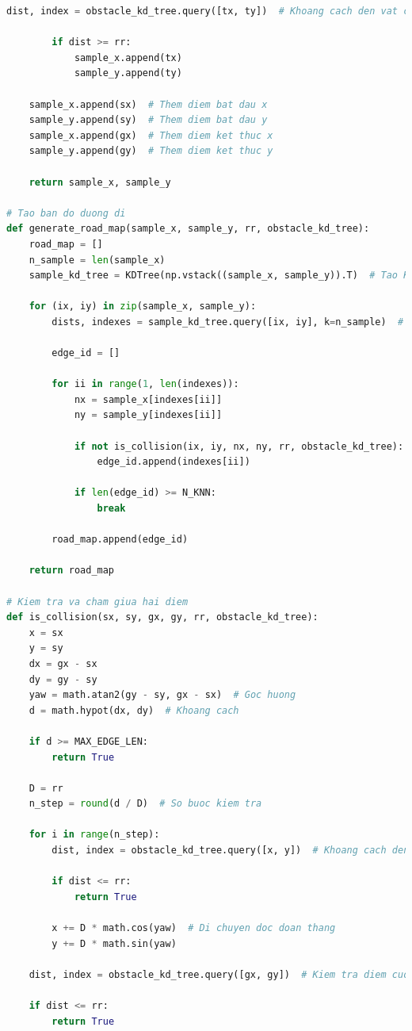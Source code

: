 \documentclass[12pt,a4paper,openany,oneside]{report}
\begin{document}
\begin{lstlisting}[language=Python, caption=Cài đặt thuật toán PRM bằng Python]
        dist, index = obstacle_kd_tree.query([tx, ty])  # Khoang cach den vat can

        if dist >= rr:
            sample_x.append(tx)
            sample_y.append(ty)

    sample_x.append(sx)  # Them diem bat dau x
    sample_y.append(sy)  # Them diem bat dau y
    sample_x.append(gx)  # Them diem ket thuc x
    sample_y.append(gy)  # Them diem ket thuc y

    return sample_x, sample_y

# Tao ban do duong di
def generate_road_map(sample_x, sample_y, rr, obstacle_kd_tree):
    road_map = []
    n_sample = len(sample_x)
    sample_kd_tree = KDTree(np.vstack((sample_x, sample_y)).T)  # Tao KDTree cho diem mau

    for (ix, iy) in zip(sample_x, sample_y):
        dists, indexes = sample_kd_tree.query([ix, iy], k=n_sample)  # Tim hang xom gan nhat

        edge_id = []

        for ii in range(1, len(indexes)):
            nx = sample_x[indexes[ii]]
            ny = sample_y[indexes[ii]]

            if not is_collision(ix, iy, nx, ny, rr, obstacle_kd_tree):  # Kiem tra va cham
                edge_id.append(indexes[ii])

            if len(edge_id) >= N_KNN:
                break

        road_map.append(edge_id)

    return road_map

# Kiem tra va cham giua hai diem
def is_collision(sx, sy, gx, gy, rr, obstacle_kd_tree):
    x = sx
    y = sy
    dx = gx - sx
    dy = gy - sy
    yaw = math.atan2(gy - sy, gx - sx)  # Goc huong
    d = math.hypot(dx, dy)  # Khoang cach

    if d >= MAX_EDGE_LEN:
        return True

    D = rr
    n_step = round(d / D)  # So buoc kiem tra

    for i in range(n_step):
        dist, index = obstacle_kd_tree.query([x, y])  # Khoang cach den vat can

        if dist <= rr:
            return True

        x += D * math.cos(yaw)  # Di chuyen doc doan thang
        y += D * math.sin(yaw)

    dist, index = obstacle_kd_tree.query([gx, gy])  # Kiem tra diem cuoi

    if dist <= rr:
        return True


\end{lstlisting}
\end{document}

